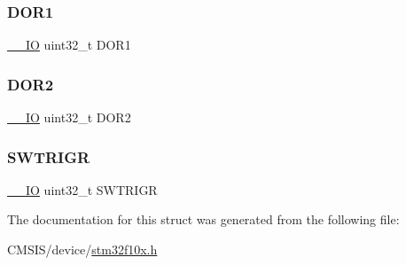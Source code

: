 \subsubsection{\texorpdfstring{DOR1}{DOR1}}
{\footnotesize\ttfamily \mbox{\hyperlink{core__sc300_8h_aec43007d9998a0a0e01faede4133d6be}{\+\_\+\+\_\+\+IO}} uint32\+\_\+t D\+O\+R1}

\mbox{\label{struct_d_a_c___type_def_aba9fb810b0cf6cbc1280c5c63be2418b}} 
\subsubsection{\texorpdfstring{DOR2}{DOR2}}
{\footnotesize\ttfamily \mbox{\hyperlink{core__sc300_8h_aec43007d9998a0a0e01faede4133d6be}{\+\_\+\+\_\+\+IO}} uint32\+\_\+t D\+O\+R2}

\mbox{\label{struct_d_a_c___type_def_a896bbb7153af0b67ad772360feaceeb4}} 
\subsubsection{\texorpdfstring{SWTRIGR}{SWTRIGR}}
{\footnotesize\ttfamily \mbox{\hyperlink{core__sc300_8h_aec43007d9998a0a0e01faede4133d6be}{\+\_\+\+\_\+\+IO}} uint32\+\_\+t S\+W\+T\+R\+I\+GR}



The documentation for this struct was generated from the following file\+:\begin{DoxyCompactItemize}
\item 
C\+M\+S\+I\+S/device/\mbox{\hyperlink{stm32f10x_8h}{stm32f10x.\+h}}\end{DoxyCompactItemize}
